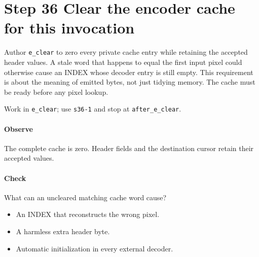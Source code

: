 \section{Step 36 Clear the encoder cache for this invocation}\label{qoi-s36}
Author \texttt{e\_clear} to zero every private cache entry while retaining the accepted header values. A stale word that happens to equal the first input pixel could otherwise cause an INDEX whose decoder entry is still empty. This requirement is about the meaning of emitted bytes, not just tidying memory. The cache must be ready before any pixel lookup.

Work in \texttt{e\_clear}; use \texttt{s36-1} and stop at \texttt{after\_e\_clear}.

\paragraph{Observe} The complete cache is zero. Header fields and the destination cursor retain their accepted values.

\paragraph{Check} What can an uncleared matching cache word cause?
\begin{itemize}
  \item[A.] An INDEX that reconstructs the wrong pixel.
  \item[B.] A harmless extra header byte.
  \item[C.] Automatic initialization in every external decoder.
\end{itemize}
